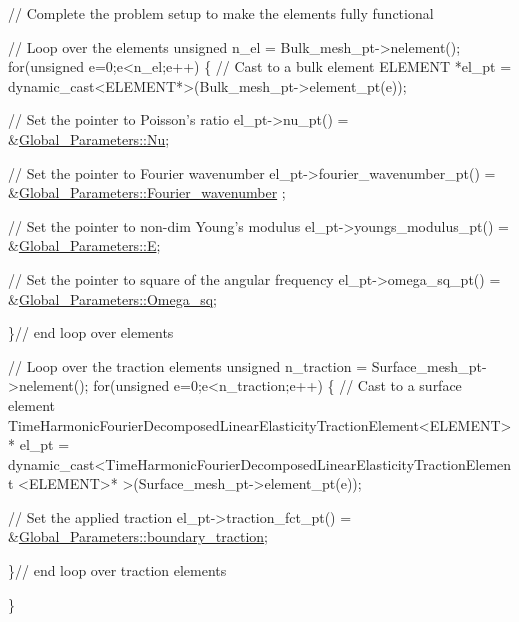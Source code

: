\begin{DoxyCodeInclude}
 \textcolor{comment}{// Complete the problem setup to make the elements fully functional}

 \textcolor{comment}{// Loop over the elements}
 \textcolor{keywordtype}{unsigned} n\_el = Bulk\_mesh\_pt->nelement();
 \textcolor{keywordflow}{for}(\textcolor{keywordtype}{unsigned} e=0;e<n\_el;e++)
  \{
   \textcolor{comment}{// Cast to a bulk element}
   ELEMENT *el\_pt = \textcolor{keyword}{dynamic\_cast<}ELEMENT*\textcolor{keyword}{>}(Bulk\_mesh\_pt->element\_pt(e));

   \textcolor{comment}{// Set the pointer to Poisson's ratio}
   el\_pt->nu\_pt() = &\hyperlink{namespaceGlobal__Parameters_a5978c2a1498ec7775b228a11a3912209}{Global\_Parameters::Nu};

   \textcolor{comment}{// Set the pointer to Fourier wavenumber}
   el\_pt->fourier\_wavenumber\_pt() = &\hyperlink{namespaceGlobal__Parameters_ae1198385d90f52c4ed921520ae43a9e7}{Global\_Parameters::Fourier\_wavenumber}
      ;

   \textcolor{comment}{// Set the pointer to non-dim Young's modulus}
   el\_pt->youngs\_modulus\_pt() = &\hyperlink{namespaceGlobal__Parameters_ac74d762d76b56416281173421b018460}{Global\_Parameters::E};

   \textcolor{comment}{// Set the pointer to square of the angular frequency}
   el\_pt->omega\_sq\_pt() = &\hyperlink{namespaceGlobal__Parameters_aa7f960ed4311ccf6e3dbf9371f13876a}{Global\_Parameters::Omega\_sq};

  \}\textcolor{comment}{// end loop over elements}

 \textcolor{comment}{// Loop over the traction elements}
 \textcolor{keywordtype}{unsigned} n\_traction =  Surface\_mesh\_pt->nelement();
 \textcolor{keywordflow}{for}(\textcolor{keywordtype}{unsigned} e=0;e<n\_traction;e++)
  \{
   \textcolor{comment}{// Cast to a surface element}
   TimeHarmonicFourierDecomposedLinearElasticityTractionElement<ELEMENT>*
    el\_pt = 
    \textcolor{keyword}{dynamic\_cast<}TimeHarmonicFourierDecomposedLinearElasticityTractionElement
    <ELEMENT\textcolor{keyword}{>}* >(Surface\_mesh\_pt->element\_pt(e));
   
   \textcolor{comment}{// Set the applied traction}
   el\_pt->traction\_fct\_pt() = &\hyperlink{namespaceGlobal__Parameters_a579fa434bf9ee57e66d4bd42b208fc23}{Global\_Parameters::boundary\_traction};
   
  \}\textcolor{comment}{// end loop over traction elements}
 
\}


\end{DoxyCodeInclude}

